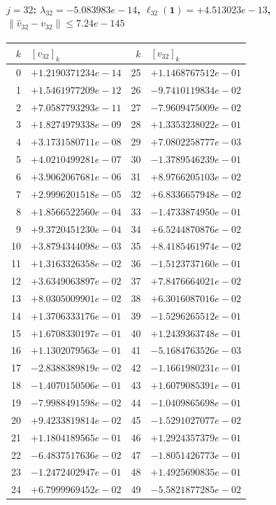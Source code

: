 \documentclass[11pt]{article}
\begin{document}
\paragraph{$j = 32$: $\lambda_{32} = -5.083983e-14$, \quad $\ell_{32}(\mathbf{1}) = +4.513023e-13$, \quad $\|\hat v_{32} - v_{32}\| \leq 7.24e-145$}
\begin{center}
{\footnotesize
\begin{tabular}{r@{\;\;}l@{\quad}r@{\;\;}l}
\toprule
$k$ & $[v_{32}]_k$ & $k$ & $[v_{32}]_k$ \\
\midrule
0 & $+1.2190371234e-14$ & 25 & $+1.1468767512e-01$ \\
1 & $+1.5461977209e-12$ & 26 & $-9.7410119834e-02$ \\
2 & $+7.0587793293e-11$ & 27 & $-7.9609475009e-02$ \\
3 & $+1.8274979338e-09$ & 28 & $+1.3353238022e-01$ \\
4 & $+3.1731580711e-08$ & 29 & $+7.0802258777e-03$ \\
5 & $+4.0210499281e-07$ & 30 & $-1.3789546239e-01$ \\
6 & $+3.9062067681e-06$ & 31 & $+8.9766205103e-02$ \\
7 & $+2.9996201518e-05$ & 32 & $+6.8336657948e-02$ \\
8 & $+1.8566522560e-04$ & 33 & $-1.4733874950e-01$ \\
9 & $+9.3720451230e-04$ & 34 & $+6.5244870876e-02$ \\
10 & $+3.8794344098e-03$ & 35 & $+8.4185461974e-02$ \\
11 & $+1.3163326358e-02$ & 36 & $-1.5123737160e-01$ \\
12 & $+3.6349063897e-02$ & 37 & $+7.8476664021e-02$ \\
13 & $+8.0305009901e-02$ & 38 & $+6.3016087016e-02$ \\
14 & $+1.3706333176e-01$ & 39 & $-1.5296265512e-01$ \\
15 & $+1.6708330197e-01$ & 40 & $+1.2439363748e-01$ \\
16 & $+1.1302079563e-01$ & 41 & $-5.1684763526e-03$ \\
17 & $-2.8388389819e-02$ & 42 & $-1.1661980231e-01$ \\
18 & $-1.4070150506e-01$ & 43 & $+1.6079085391e-01$ \\
19 & $-7.9988491598e-02$ & 44 & $-1.0409865698e-01$ \\
20 & $+9.4233819814e-02$ & 45 & $-1.5291027077e-02$ \\
21 & $+1.1804189565e-01$ & 46 & $+1.2924357379e-01$ \\
22 & $-6.4837517636e-02$ & 47 & $-1.8051426773e-01$ \\
23 & $-1.2472402947e-01$ & 48 & $+1.4925690835e-01$ \\
24 & $+6.7999969452e-02$ & 49 & $-5.5821877285e-02$ \\
\bottomrule
\end{tabular}
}
\end{center}
\end{document}
